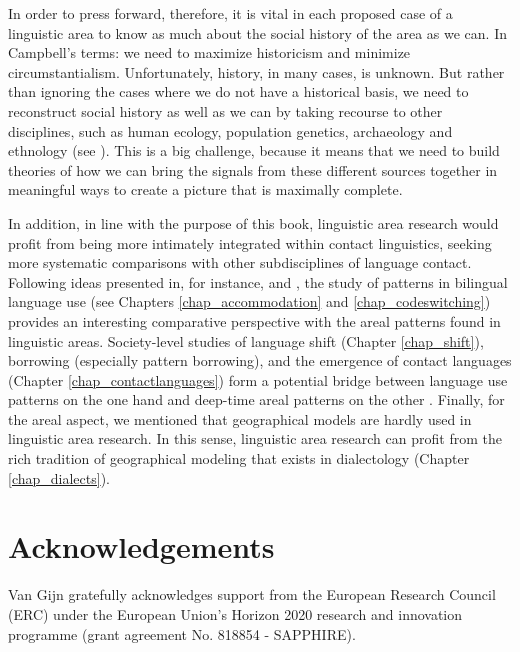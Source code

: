 \documentclass[output=paper]{langscibook}
\begin{document}
In order to press forward, therefore, it is vital in each proposed case of a linguistic area to know as much about the social history of the area as we can. In Campbell's \parencite*{campbell1985} terms: we need to maximize historicism and minimize circumstantialism. Unfortunately, history, in many cases, is unknown. But rather than ignoring the cases where we do not have a historical basis, we need to reconstruct social history as well as we can by taking recourse to other disciplines, such as human ecology, population genetics, archaeology and ethnology (see \citealt{GijnForthcSeparating}). This is a big challenge, because it means that we need to build theories of how we can bring the signals from these different sources together in meaningful ways to create a picture that is maximally complete.

In addition, in line with the purpose of this book, linguistic area research would profit from being more intimately integrated within contact linguistics, seeking more systematic comparisons with other subdisciplines of language contact. Following ideas presented in, for instance, \citet{niedzielskietal1996linguistic} and \citet{muysken2013language}, the study of patterns in bilingual language use (see Chapters \ref{chap_accommodation} and \ref{chap_codeswitching}) provides an interesting comparative perspective with the areal patterns found in linguistic areas. Society-level studies of language shift (Chapter \ref{chap_shift}), borrowing (especially pattern borrowing), and the emergence of contact languages (Chapter \ref{chap_contactlanguages}) form a potential bridge between language use patterns on the one hand and deep-time areal patterns on the other \parencite[see][]{muysken2008conceptual}. Finally, for the areal aspect, we mentioned that geographical models are hardly used in linguistic area research. In this sense, linguistic area research can profit from the rich tradition of geographical modeling that exists in dialectology (Chapter \ref{chap_dialects}).


\section*{Acknowledgements}
Van Gijn gratefully acknowledges support from the European Research Council (ERC) under the European Union’s Horizon 2020 research and innovation programme (grant agreement No. 818854 - SAPPHIRE).


\printbibliography[heading=subbibliography,notkeyword=this]
\end{document}

